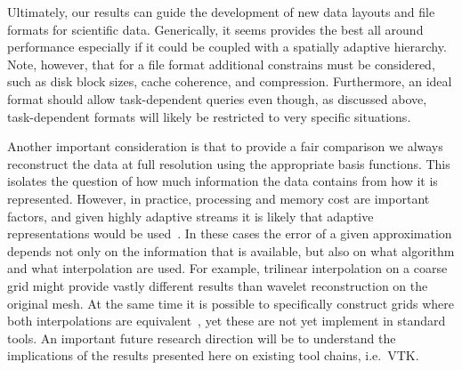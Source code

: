 Ultimately, our results can guide the development of new data layouts and file formats for
scientific data. Generically, it seems \swav provides the best all around performance especially if
it could be coupled with a spatially adaptive hierarchy. Note, however, that for a file format
additional constrains must be considered, such as disk block sizes, cache coherence, and
compression. Furthermore, an ideal format should allow task-dependent queries even though, as
discussed above, task-dependent formats will likely be restricted to very specific situations. 

Another important consideration is that to provide a fair comparison we always reconstruct the data
at full resolution using the appropriate basis functions. This isolates the question of how much
information the data contains from how it is represented. However, in practice, processing and
memory cost are important factors, and given highly adaptive streams it is likely that adaptive
representations would be used~\cite{gigavoxels,Gobbetti2008,vdb2013}. In these cases the error of a
given approximation depends not only on the information that is available, but also on what
algorithm and what interpolation are used. For example, trilinear interpolation on a coarse grid
might provide vastly different results than wavelet reconstruction on the original mesh. At the same
time it is possible to specifically construct grids where both interpolations are
equivalent~\cite{weiss}, yet these are not yet implement in standard tools. An important future
research direction will be to understand the implications of the results presented here on existing
tool chains, i.e.\ VTK.


